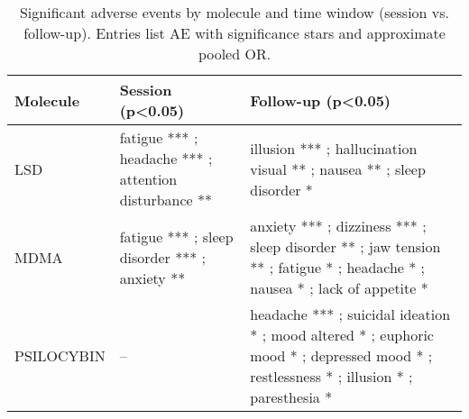 \begin{table}[!h]
\centering
\caption{\label{tab:tab:ae-signif-by-window}Significant adverse events by molecule and time window (session vs. follow-up). Entries list AE with significance stars and approximate pooled OR.}
\centering
\begin{tabular}[t]{lll}
\toprule
Molecule & Session (p<0.05) & Follow-up (p<0.05)\\
\midrule
LSD & fatigue *** ; headache *** ; attention disturbance ** & illusion *** ; hallucination visual ** ; nausea **  ; sleep disorder *  \\
MDMA & fatigue ***  ; sleep disorder ***  ; anxiety **   & anxiety ***  ; dizziness ***  ; sleep disorder **  ; jaw tension **  ; fatigue *  ; headache *  ; nausea *  ; lack of appetite *  \\
PSILOCYBIN & -- & headache ***  ; suicidal ideation *  ; mood altered *  ; euphoric mood *  ; depressed mood *  ; restlessness *  ; illusion *  ; paresthesia *  \\
\bottomrule
\end{tabular}
\end{table}